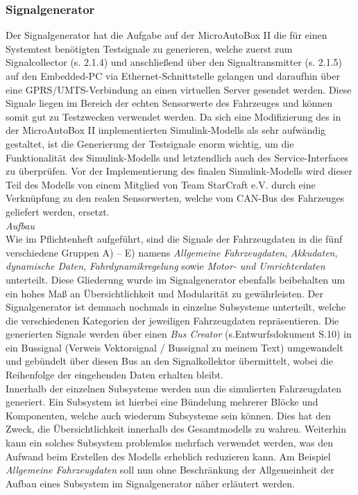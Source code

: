\documentclass[fontsize = 12pt, paper = a4]{scrreprt}
\begin{document}
\subsubsection{Signalgenerator}


Der Signalgenerator hat die Aufgabe auf der MicroAutoBox II die für einen Systemtest benötigten Testsignale zu generieren, welche zuerst zum Signalcollector (s. 2.1.4) und anschließend über den  Signaltransmitter (s. 2.1.5)  auf den Embedded-PC via Ethernet-Schnittstelle gelangen und daraufhin über eine GPRS/UMTS-Verbindung an einen virtuellen Server gesendet werden. Diese Signale liegen im Bereich der echten Sensorwerte des Fahrzeuges und können somit gut zu Testzwecken verwendet werden. Da sich eine Modifizierung des in der MicroAutoBox II implementierten Simulink-Modells als sehr aufwändig gestaltet, ist die Generierung der Testsignale enorm wichtig, um die Funktionalität des Simulink-Modells und letztendlich auch des Service-Interfaces zu überprüfen. Vor der Implementierung des finalen Simulink-Modells wird dieser Teil des Modells von einem Mitglied von Team StarCraft e.V. durch eine Verknüpfung zu den realen Sensorwerten, welche vom CAN-Bus des Fahrzeuges geliefert werden, ersetzt. \\

\textit{Aufbau} \\

Wie im Pflichtenheft aufgeführt, sind die Signale der Fahrzeugdaten in die fünf verschiedene Gruppen A) -- E) namens \textit{Allgemeine Fahrzeugdaten}, \textit{Akkudaten}, \textit{dynamische Daten}, \textit{Fahrdynamikregelung} sowie \textit{Motor- und Umrichterdaten} unterteilt. Diese Gliederung wurde im Signalgenerator ebenfalls beibehalten um ein hohes Maß an Übersichtlichkeit und Modularität zu gewährleisten. Der Signalgenerator ist demnach nochmals in einzelne Subsysteme unterteilt, welche die verschiedenen Kategorien der jeweiligen Fahrzeugdaten repräsentieren. Die generierten Signale werden über einen \textit{Bus Creator} (s.Entwurfsdokument S.10) in ein Bussignal (Verweis Vektorsignal / Bussignal zu meinem Text) umgewandelt und gebündelt über diesen Bus an den Signalkollektor übermittelt, wobei die Reihenfolge der eingehenden Daten erhalten bleibt. \\

Innerhalb der einzelnen Subsysteme werden nun die simulierten Fahrzeugdaten generiert. Ein Subsystem ist hierbei eine Bündelung mehrerer Blöcke und Komponenten, welche auch wiederum Subsysteme sein können. Dies hat den Zweck, die Übersichtlichkeit innerhalb des Gesamtmodells zu wahren. Weiterhin kann ein solches Subsystem problemlos mehrfach verwendet werden, was den Aufwand beim Erstellen des Modells erheblich reduzieren kann. Am Beispiel \textit{Allgemeine Fahrzeugdaten} soll nun ohne Beschränkung der Allgemeinheit der Aufbau eines Subsystem im Signalgenerator näher erläutert werden.
\end{document}
